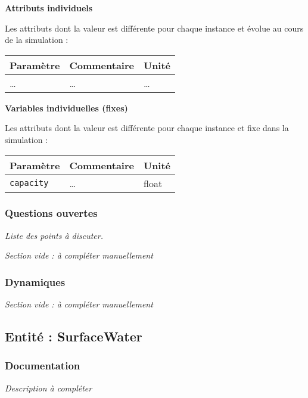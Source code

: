 \documentclass[
]{article}
\begin{document}
\textbf{Attributs individuels}

Les attributs dont la valeur est différente pour chaque instance et
évolue au cours de la simulation :

\begin{longtable}[]{@{}lll@{}}
\toprule\noalign{}
\textbf{Paramètre} & \textbf{Commentaire} & \textbf{Unité} \\
\midrule\noalign{}
\endhead
\bottomrule\noalign{}
\endlastfoot
\ldots{} & \ldots{} & \ldots{} \\
\end{longtable}

\textbf{Variables individuelles (fixes)}

Les attributs dont la valeur est différente pour chaque instance et fixe
dans la simulation :

\begin{longtable}[]{@{}lll@{}}
\toprule\noalign{}
\textbf{Paramètre} & \textbf{Commentaire} & \textbf{Unité} \\
\midrule\noalign{}
\endhead
\bottomrule\noalign{}
\endlastfoot
\texttt{capacity} & \ldots{} & float \\
\end{longtable}

\subsubsection{Questions ouvertes}\label{questions-ouvertes-9}

\emph{Liste des points à discuter.}

\emph{Section vide : à compléter manuellement}

\subsubsection{Dynamiques}\label{dynamiques-9}

\emph{Section vide : à compléter manuellement}

\subsection{Entité : SurfaceWater}\label{entituxe9-surfacewater}

\subsubsection{Documentation}\label{documentation-14}

\emph{Description à compléter}
\end{document}
